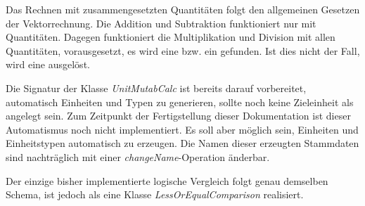 Das Rechnen mit zusammengesetzten Quantitäten folgt den allgemeinen Gesetzen der Vektorrechnung. Die Addition und Subtraktion funktioniert nur mit  Quantitäten. Dagegen funktioniert die Multiplikation und Division mit allen Quantitäten, vorausgesetzt, es wird eine  bzw. ein  gefunden. Ist dies nicht der Fall, wird eine  ausgelöst. 

Die Signatur der Klasse 
\textit{UnitMutabCalc} ist bereits darauf vorbereitet, automatisch Einheiten und Typen zu generieren, sollte noch keine Zieleinheit als  angelegt sein. Zum Zeitpunkt der Fertigstellung dieser Dokumentation ist dieser Automatismus noch nicht implementiert. Es soll aber möglich sein, Einheiten und Einheitstypen automatisch zu erzeugen. Die Namen dieser erzeugten Stammdaten sind nachträglich mit einer \textit{changeName}-Operation änderbar.

Der einzige bisher implementierte logische Vergleich  folgt genau demselben Schema, ist jedoch als eine Klasse \textit{LessOrEqualComparison} realisiert.
